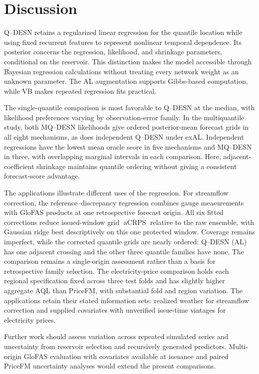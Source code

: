 \documentclass[12pt,letterpaper]{article}
\numberwithin{equation}{section}
\newcommand{\aCRPS}{\operatorname{aCRPS}}
\begin{document}
\section{Discussion}
\label{sec:discussion}

Q--DESN retains a regularized linear regression for the quantile location
while using fixed recurrent features to represent nonlinear temporal
dependence. Its posterior concerns the regression, likelihood, and shrinkage
parameters, conditional on the reservoir. This distinction makes the model
accessible through Bayesian regression calculations without treating every
network weight as an unknown parameter. The AL augmentation supports
Gibbs-based computation, while VB makes repeated regression fits practical.

The single-quantile comparison is most favorable to Q--DESN at the median,
with likelihood preferences varying by observation-error family. In the
multiquantile study, both MQ--DESN likelihoods give ordered posterior-mean
forecast grids in all eight mechanisms, as does independent Q--DESN under
exAL. Independent regressions have the lowest mean oracle score in five
mechanisms and MQ--DESN in three, with overlapping marginal intervals in
each comparison. Here, adjacent-coefficient shrinkage maintains quantile
ordering without giving a consistent forecast-score advantage.

The applications illustrate different uses of the regression. For streamflow
correction, the reference--discrepancy regression combines gauge measurements
with GloFAS products at one retrospective forecast origin.
All six fitted corrections reduce issued-window grid \(\aCRPS\) relative to
the raw ensemble, with Gaussian ridge best descriptively on this one protected
window. Coverage remains imperfect, while the corrected quantile grids are
nearly ordered: Q--DESN (AL) has one adjacent crossing and the other three
quantile families have none. The comparison remains a single-origin
assessment rather than a basis for retrospective family selection.
The electricity-price comparison holds each regional
specification fixed across three test folds and has slightly higher aggregate
AQL than PriceFM, with substantial fold and region variation. The
applications retain their stated information sets: realized weather for
streamflow correction and supplied covariates with unverified issue-time
vintages for electricity prices.

Further work should assess variation across repeated simulated series and
uncertainty from reservoir selection and recursively generated predictors.
Multi-origin GloFAS evaluation with covariates available at issuance and
paired PriceFM uncertainty analyses would extend the present comparisons.
\end{document}
